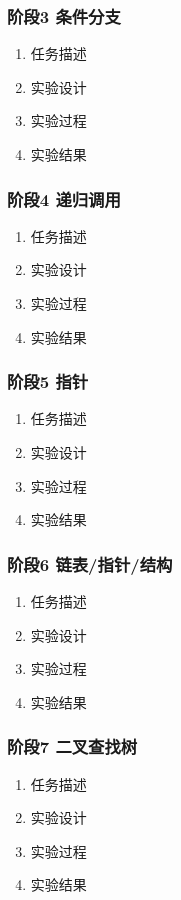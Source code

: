 \documentclass{paper}
\begin{document}
\subsubsection{阶段3 条件分支}
\begin{enumerate}
\item 任务描述
\item 实验设计
\item 实验过程
\item 实验结果
\end{enumerate}

\subsubsection{阶段4 递归调用}
\begin{enumerate}
\item 任务描述
\item 实验设计
\item 实验过程
\item 实验结果
\end{enumerate}

\subsubsection{阶段5 指针}
\begin{enumerate}
\item 任务描述
\item 实验设计
\item 实验过程
\item 实验结果
\end{enumerate}

\subsubsection{阶段6 链表/指针/结构}
\begin{enumerate}
\item 任务描述
\item 实验设计
\item 实验过程
\item 实验结果
\end{enumerate}

\subsubsection{阶段7 二叉查找树}
\begin{enumerate}
\item 任务描述
\item 实验设计
\item 实验过程
\item 实验结果
\end{enumerate}
\end{document}
